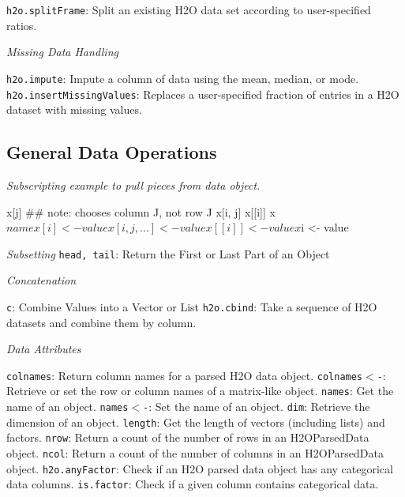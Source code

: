 {\texttt{h2o.splitFrame}: Split an existing H2O data set according to user-specified ratios.\newline

\emph{Missing Data Handling}\par
{\texttt{h2o.impute}}: Impute a column of data using the mean, median, or mode.\newline
{\texttt{h2o.insertMissingValues}}: Replaces a user-specified fraction of entries in a H2O dataset with missing values.\newline

\subsection{General Data Operations}

\emph{Subscripting example to pull pieces from data object.} 
\begin{spverbatim} 
  x[j]  ## note: chooses column J, not row J
  x[i, j]
  x[[i]]
  x$name 
  x[i] <- value
  x[i, j, ...] <- value
  x[[i]] <- value
  x$i <- value
\end{spverbatim}

\emph{Subsetting}\newline
{\texttt{head, tail}}: Return the First or Last Part of an Object\newline

\emph{Concatenation}\par
 {\texttt{c}}: Combine Values into a Vector or List\newline%
 {\texttt{h2o.cbind}}: Take a sequence of H2O datasets and combine them by column.\par
{\emph{Data Attributes}}\par
{\texttt{colnames}}: Return column names for a parsed H2O data object. \newline
{\texttt{colnames$<$-}}: Retrieve or set the row or column names of a matrix-like object.\newline
{\texttt{names}}: Get the name of an object. \newline
{\texttt{names$<$-}}: Set the name of an object. \newline
{\texttt{dim}}: Retrieve the dimension of an object. \newline
{\texttt{length}}: Get the length of vectors (including lists) and factors. \newline
{\texttt{nrow}}: Return a count of the number of rows in an H2OParsedData object. \newline
{\texttt{ncol}}: Return a count of the number of columns in an H2OParsedData object.\newline
{\texttt{h2o.anyFactor}}: Check if an H2O parsed data object has any categorical data columns. \newline
{\texttt{is.factor}}: Check if a given column contains categorical data.\newline

}

